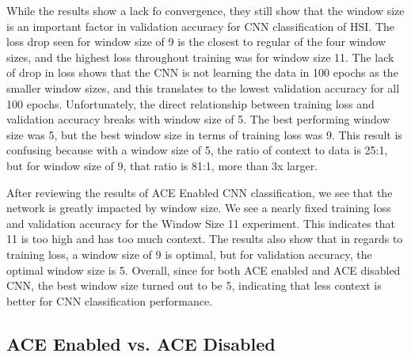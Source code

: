 \documentclass[12pt]{article}
\begin{document}
While the results show a lack fo convergence, they still show that the window size is an important factor in validation accuracy for CNN classification of HSI.
%
The loss drop seen for window size of 9 is the closest to regular of the four window sizes, and the highest loss throughout training was for window size 11.
%
The lack of drop in loss shows that the CNN is not learning the data in 100 epochs as the smaller window sizes, and this translates to the lowest validation accuracy for all 100 epochs.
%
Unfortunately, the direct relationship between training loss and validation accuracy breaks with window size of 5.
%
The best performing window size was 5, but the best window size in terms of training loss was 9. 
%
This result is confusing because with a window size of 5, the ratio of context to data is 25:1, but for window size of 9, that ratio is 81:1, more than 3x larger.

After reviewing the results of ACE Enabled CNN classification, we see that the network is greatly impacted by window size.
%
We see a nearly fixed training loss and validation accuracy for the Window Size 11 experiment. 
%
This indicates that 11 is too high and has too much context.
%
The results also show that in regards to training loss, a window size of 9 is optimal, but for validation accuracy, the optimal window size is 5.
%
Overall, since for both ACE enabled and ACE disabled CNN, the best window size turned out to be 5, indicating that less context is better for CNN classification performance.


\subsection{ACE Enabled vs. ACE Disabled}
\end{document}

